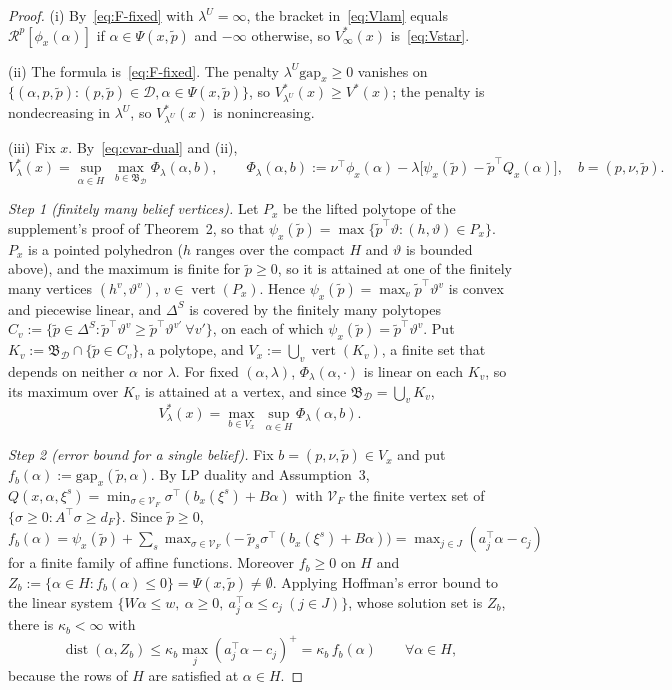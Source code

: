 \documentclass[11pt]{article}
\theoremstyle{definition}
\theoremstyle{remark}
\newcommand{\D}{\mathcal{D}}
\newcommand{\tp}{\tilde{p}}
\newcommand{\B}{\mathfrak{B}}
\newcommand{\R}{\mathcal{R}}
\newcommand{\gap}{\mathrm{gap}}
\DeclareMathOperator{\vertex}{vert}
\DeclareMathOperator{\dist}{dist}
\begin{document}
\begin{proof}
(i) By~\eqref{eq:F-fixed} with $\lambda^U=\infty$, the bracket in~\eqref{eq:Vlam} equals $\R^p[\phi_x(\alpha)]$ if $\alpha\in\Psi(x,\tp)$ and $-\infty$ otherwise, so $V^*_\infty(x)$ is~\eqref{eq:Vstar}.

(ii) The formula is~\eqref{eq:F-fixed}. The penalty $\lambda^U\gap_x\ge0$ vanishes on $\{(\alpha,p,\tp):(p,\tp)\in\D,\alpha\in\Psi(x,\tp)\}$, so $V^*_{\lambda^U}(x)\ge V^*(x)$; the penalty is nondecreasing in $\lambda^U$, so $V^*_{\lambda^U}(x)$ is nonincreasing.

(iii) Fix $x$. By~\eqref{eq:cvar-dual} and (ii),
\begin{equation}\label{eq:pen-b}
  V^*_{\lambda}(x)=\sup_{\alpha\in H}\ \max_{b\in\B_\D}\Phi_\lambda(\alpha,b),\qquad
  \Phi_\lambda(\alpha,b):=\nu^\top\phi_x(\alpha)-\lambda\big[\psi_x(\tp)-\tp^\top Q_x(\alpha)\big],\quad b=(p,\nu,\tp).
\end{equation}

\emph{Step 1 (finitely many belief vertices).} Let $P_x$ be the lifted polytope of the supplement's proof of Theorem~2, so that $\psi_x(\tp)=\max\{\tp^\top\vartheta:(h,\vartheta)\in P_x\}$. $P_x$ is a pointed polyhedron ($h$ ranges over the compact $H$ and $\vartheta$ is bounded above), and the maximum is finite for $\tp\ge0$, so it is attained at one of the finitely many vertices $(h^v,\vartheta^v)$, $v\in\vertex(P_x)$. Hence $\psi_x(\tp)=\max_{v}\tp^\top\vartheta^v$ is convex and piecewise linear, and $\Delta^S$ is covered by the finitely many polytopes $C_v:=\{\tp\in\Delta^S:\tp^\top\vartheta^v\ge\tp^\top\vartheta^{v'}\ \forall v'\}$, on each of which $\psi_x(\tp)=\tp^\top\vartheta^v$. Put $K_v:=\B_\D\cap\{\tp\in C_v\}$, a polytope, and $V_x:=\bigcup_v\vertex(K_v)$, a finite set that depends on neither $\alpha$ nor $\lambda$. For fixed $(\alpha,\lambda)$, $\Phi_\lambda(\alpha,\cdot)$ is linear on each $K_v$, so its maximum over $K_v$ is attained at a vertex, and since $\B_\D=\bigcup_vK_v$,
\[
  V^*_{\lambda}(x)=\max_{b\in V_x}\ \sup_{\alpha\in H}\Phi_\lambda(\alpha,b).
\]

\emph{Step 2 (error bound for a single belief).} Fix $b=(p,\nu,\tp)\in V_x$ and put $f_b(\alpha):=\gap_x(\tp,\alpha)$. By LP duality and Assumption~3, $Q(x,\alpha,\xi^s)=\min_{\sigma\in\mathcal V_F}\sigma^\top(b_x(\xi^s)+B\alpha)$ with $\mathcal V_F$ the finite vertex set of $\{\sigma\ge0:A^\top\sigma\ge d_F\}$. Since $\tp\ge0$, $f_b(\alpha)=\psi_x(\tp)+\sum_s\max_{\sigma\in\mathcal V_F}\big(-\tp_s\sigma^\top(b_x(\xi^s)+B\alpha)\big)=\max_{j\in J}(a_j^\top\alpha-c_j)$ for a finite family of affine functions. Moreover $f_b\ge0$ on $H$ and $Z_b:=\{\alpha\in H:f_b(\alpha)\le0\}=\Psi(x,\tp)\neq\emptyset$. Applying Hoffman's error bound to the linear system $\{W\alpha\le w,\ \alpha\ge0,\ a_j^\top\alpha\le c_j\ (j\in J)\}$, whose solution set is $Z_b$, there is $\kappa_b<\infty$ with
\[
  \dist(\alpha,Z_b)\le\kappa_b\max_{j}(a_j^\top\alpha-c_j)^+=\kappa_b\,f_b(\alpha)\qquad\forall\alpha\in H,
\]
because the rows of $H$ are satisfied at $\alpha\in H$.


\end{proof}
\end{document}
